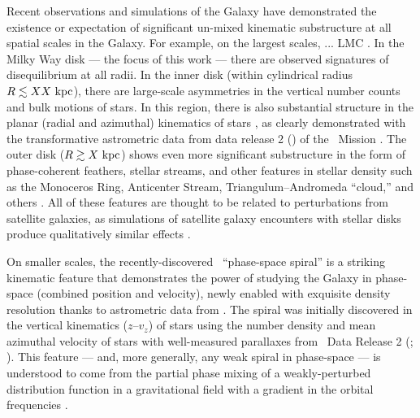 Recent observations and simulations of the Galaxy have demonstrated the existence or expectation of significant un-mixed kinematic substructure at all spatial scales in the Galaxy.
For example, on the largest scales, ... LMC \citep[e.g.,][]{Garavito-Camargo, blah}.
In the Milky Way disk --- the focus of this work --- there are observed signatures of disequilibrium at all radii.
In the inner disk (within cylindrical radius $R \lesssim XX~\mathrm{kpc}$), there are large-scale asymmetries in the vertical number counts \citep{Widrow??} and bulk motions \citep{Carlin??} of stars.
In this region, there is also substantial structure in the planar (radial and azimuthal) kinematics of stars \citep{Katz:XX}, as clearly demonstrated with the transformative astrometric data from data release 2 () of the \gaia\ Mission \citep{Gaia-dr2-papers}.
The outer disk ($R \gtrsim X~\mathrm{kpc}$) shows even more significant substructure in the form of phase-coherent feathers, stellar streams, and other features in stellar density such as the Monoceros Ring, Anticenter Stream, Triangulum--Andromeda ``cloud,'' and others \citep{Newberg, Slater, Price-Whelan, Xu, Li, Sheffield, Laporte}.
All of these features are thought to be related to perturbations from satellite galaxies, as simulations of satellite galaxy encounters with stellar disks produce qualitatively similar effects \citep[e.g.,][]{Old-paper,others, Laporte:2019}.

On smaller scales, the recently-discovered \gaia\ ``phase-space spiral'' is a striking kinematic feature that demonstrates the power of studying the Galaxy in phase-space (combined position and velocity), newly enabled with exquisite density resolution thanks to astrometric data from \gaia.
The spiral was initially discovered in the vertical kinematics ($z$--$v_z$) of stars using the number density and mean azimuthal velocity of stars with well-measured parallaxes from \gaia\ Data Release 2 (; \citealt{Antoja:2018}).
This feature --- and, more generally, any weak spiral in phase-space --- is understood to come from the partial phase mixing of a weakly-perturbed distribution function in a gravitational field with a gradient in the orbital frequencies \citep[e.g.,][]{Binney:2018}.

